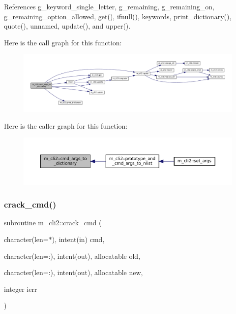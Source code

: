 References g\+\_\+keyword\+\_\+single\+\_\+letter, g\+\_\+remaining, g\+\_\+remaining\+\_\+on, g\+\_\+remaining\+\_\+option\+\_\+allowed, get(), ifnull(), keywords, print\+\_\+dictionary(), quote(), unnamed, update(), and upper().

Here is the call graph for this function\+:\nopagebreak
\begin{figure}[H]
\begin{center}
\leavevmode
\includegraphics[width=350pt]{namespacem__cli2_a3348b0c76dadd62c536e06f82bcb0331_cgraph}
\end{center}
\end{figure}
Here is the caller graph for this function\+:\nopagebreak
\begin{figure}[H]
\begin{center}
\leavevmode
\includegraphics[width=350pt]{namespacem__cli2_a3348b0c76dadd62c536e06f82bcb0331_icgraph}
\end{center}
\end{figure}
\mbox{\label{namespacem__cli2_a710b26995119aee101959555b1bac8e2}} 
\subsubsection{\texorpdfstring{crack\+\_\+cmd()}{crack\_cmd()}}
{\footnotesize\ttfamily subroutine m\+\_\+cli2\+::crack\+\_\+cmd (\begin{DoxyParamCaption}\item[{character(len=$\ast$), intent(in)}]{cmd,  }\item[{character(len=\+:), intent(out), allocatable}]{old,  }\item[{character(len=\+:), intent(out), allocatable}]{new,  }\item[{integer}]{ierr }\end{DoxyParamCaption})\hspace{0.3cm}{\ttfamily [private]}}




